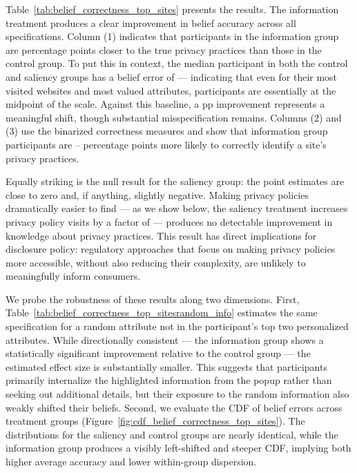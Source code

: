 \documentclass[12pt]{article}
\theoremstyle{definition}
\theoremstyle{remark}
\begin{document}
Table~\ref{tab:belief_correctness_top_sites} presents the results. The information treatment produces a clear improvement in belief accuracy across all specifications. Column (1) indicates that participants in the information group are \beliefDistanceInfoPP{} percentage points closer to the true privacy practices than those in the control group. To put this in context, the median participant in both the control and saliency groups has a belief error of \beliefErrorMedianBaseline{} --- indicating that even for their most visited websites and most valued attributes, participants are essentially at the midpoint of the scale. Against this baseline, a \beliefDistanceInfoPP{} pp improvement represents a meaningful shift, though substantial misspecification remains. Columns (2) and (3) use the binarized correctness measures and show that information group participants are \beliefCorrectStrictInfoPP{}--\beliefCorrectWeakInfoPP{} percentage points more likely to correctly identify a site's privacy practices.

Equally striking is the null result for the saliency group: the point estimates are close to zero and, if anything, slightly negative. Making privacy policies dramatically easier to find --- as we show below, the saliency treatment increases privacy policy visits by a factor of \policyVisitSaliencyFold{} --- produces no detectable improvement in knowledge about privacy practices. This result has direct implications for disclosure policy: regulatory approaches that focus on making privacy policies more accessible, without also reducing their complexity, are unlikely to meaningfully inform consumers.
 
We probe the robustness of these results along two dimensions. First, Table~\ref{tab:belief_correctness_top_sitesrandom_info} estimates the same specification for a random attribute not in the participant's top two personalized attributes. While directionally consistent --- the information group shows a statistically significant improvement relative to the control group --- the estimated effect size is substantially smaller. This suggests that participants primarily internalize the highlighted information from the popup rather than seeking out additional details, but their exposure to the random information also weakly shifted their beliefs. Second, we evaluate the CDF of belief errors across treatment groups (Figure~\ref{fig:cdf_belief_correctness_top_sites}). The distributions for the saliency and control groups are nearly identical, while the information group produces a visibly left-shifted and steeper CDF, implying both higher average accuracy and lower within-group dispersion.
\end{document}
